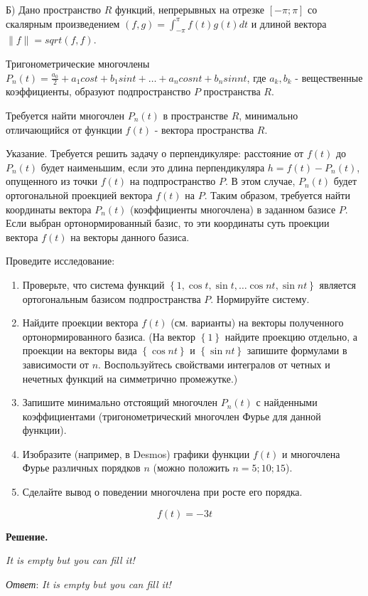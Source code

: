 Б) Дано пространство $R$ функций, непрерывных на отрезке $[-\pi; \pi]$ со скалярным произведением $(f, g) = \int^\pi_{-\pi} f(t)g(t)dt$ и длиной вектора $\|f\| = sqrt{(f, f)}$.

Тригонометрические многочлены $P_n(t) = \frac{a_0}{2} + a_1 cost + b_1 sin t + \dots + a_n cos nt + b_n sin nt$, где $a_k, b_k$ - вещественные коэффициенты,
образуют подпространство $P$ пространства $R$.

Требуется найти многочлен $P_n(t)$ в пространстве $R$, минимально отличающийся от функции $f(t)$ - вектора пространства $R$.

Указание.
Требуется решить задачу о перпендикуляре: расстояние от $f\left(t\right)$ до $P_n\left(t\right)$ будет наименьшим,
если это длина перпендикуляра $h=f\left(t\right)-P_n\left(t\right)$, опущенного из точки $f\left(t\right)$ на подпространство $P$.
В этом случае, $P_n\left(t\right)$ будет ортогональной проекцией вектора $f\left(t\right)$ на $P$.
Таким образом, требуется найти координаты вектора $P_n\left(t\right)$ (коэффициенты многочлена) в заданном базисе $P$.
Если выбран ортонормированный базис, то эти координаты суть проекции вектора $f\left(t\right)$ на векторы данного базиса.

Проведите исследование:
\begin{enumerate}
	\item Проверьте, что система функций $\left\{1,\cos{t},\sin{t},\ldots\cos{n}t,\sin{n}t\right\}$ является ортогональным базисом подпространства $P$. Нормируйте систему.
	\item Найдите проекции вектора $f\left(t\right)$ (см. варианты) на векторы полученного ортонормированного базиса.
(На вектор $\left\{1\right\}$ найдите проекцию отдельно, а проекции на векторы вида $\left\{\cos{n}t\right\}$ и $\left\{\sin{n}t\right\}$ запишите формулами в зависимости от $n$. Воспользуйтесь свойствами интегралов от четных и нечетных функций на симметрично промежутке.)
	\item Запишите минимально отстоящий многочлен $P_n\left(t\right)$ с найденными коэффициентами (тригонометрический многочлен Фурье для данной функции).
	\item Изобразите (например, в Desmos) графики функции $f\left(t\right)$ и многочлена Фурье различных порядков $n$ (можно положить $n=5;10;15$).
	\item Сделайте вывод о поведении многочлена при росте его порядка.
\end{enumerate}

\[f\left(t\right)=-3t\]

\vspace{10mm}

\textbf{Решение.}

\textit{It is empty but you can fill it!}

\textit{Ответ}: \textit{It is empty but you can fill it!}
